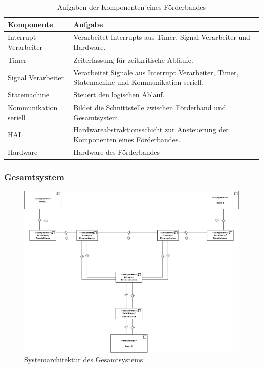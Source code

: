 \documentclass[a4paper, 11pt]{article}
\begin{document}
\begin{table}[H]
\center
    \begin{tabularx}{\textwidth}{|l|X|}
        \hline
        \textbf{Komponente}&\textbf{Aufgabe}\\
        \hline
        Interrupt Verarbeiter&Verarbeitet Interrupts aus Timer, Signal Verarbeiter und Hardware.\\
        \hline
        Timer&Zeiterfassung für zeitkritische Abläufe.\\
        \hline
        Signal Verarbeiter&Verarbeitet Signale aus Interrupt Verarbeiter, Timer, Statemachine und Kommunikation seriell.\\
        \hline
        Statemachine&Steuert den logischen Ablauf.\\
        \hline
        Kommunikation seriell&Bildet die Schnittstelle zwischen Förderband und Gesamtsystem.\\
        \hline
        HAL&Hardwareabstraktionsschicht zur Ansteuerung der Komponenten eines Förderbandes.\\
        \hline
        Hardware&Hardware des Förderbandes\\
        \hline
        \end{tabularx}
    \caption{Aufgaben der Komponenten eines Förderbandes}
    \label{archinterntcomp}
\end{table}

\newpage

\subsubsection{Gesamtsystem}

\begin{figure}[H]
\centering 
    \includegraphics[scale=0.60]{images/SW_Architektur/Gesamtsystem.jpg}
    \caption{Systemarchitektur des Gesamtsystems}
    \label{archtotal}
\end{figure}
\end{document}
